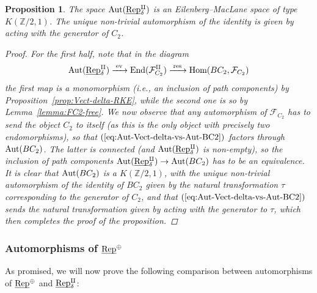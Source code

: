 \documentclass[reqno]{memo-l}
\theoremstyle{mythm}
\newtheorem{prop}[thm]{Proposition}
\theoremstyle{definition}
\numberwithin{equation}{section}
\newcommand{\Ff}{{\mathcal{F}}}
\newcommand{\Z} {{\mathbb{Z}}}
\DeclareMathOperator{\ev}{ev}
\renewcommand{\hom}{\textup{hom}}
\renewcommand{\hom}{{\textup{Hom}}}
\newcommand{\End}{{\textup{End}}}
\newcommand{\Aut}{\textup{Aut}}
\newcommand{\ulhelper}[2]{\underline{\setbox0=\hbox{$#1#2$}\dp0=0.4pt \box0\relax}}
\newcommand{\ul}[1]{{\mathpalette\ulhelper{#1}}\hbox{\rule[-2pt]{0pt}{0pt}}}
\newcommand{\Vect}{\textup{Rep}}
\begin{document}
\begin{prop}\label{prop:Aut-Vect-delta}
    The space $\Aut(\ul\Vect^\amalg_\delta)$ is an Eilenberg--MacLane space of type $K(\Z/2,1)$. The unique non-trivial automorphism of the identity is given by acting with the generator of $C_2$.
    \begin{proof}
        For the first half, note that in the diagram
        \begin{equation}\label{eq:Aut-Vect-delta-vs-Aut-BC2}
            \Aut(\ul\Vect^\amalg_\delta)\xrightarrow{\;\ev\;}\End(\Ff_{C_2}^\amalg)\xrightarrow{\;\text{res}\;}\hom(BC_2,\Ff_{C_2})
        \end{equation}
        the first map is a monomorphism (i.e., an inclusion of path components) by Proposition~\ref{prop:Vect-delta-RKE}, while the second one is so by Lemma~\ref{lemma:FC2-free}. We now observe that any automorphism of $\Ff_{C_2}$ has to send the object $C_2$ to itself (as this is the only object with precisely two endomorphisms), so that $(\ref{eq:Aut-Vect-delta-vs-Aut-BC2})$ factors through $\Aut(BC_2)$. The latter is connected (and $\Aut(\ul\Vect^\amalg_\delta)$ is non-empty), so the inclusion of path components $\Aut(\ul\Vect^\amalg_\delta)\to\Aut(BC_2)$ has to be an equivalence. It is clear that $\Aut(BC_2)$ is a $K(\Z/2,1)$, with the unique non-trivial automorphism of the identity of $BC_2$ given by the natural transformation $\tau$ corresponding to the generator of $C_2$, and that $(\ref{eq:Aut-Vect-delta-vs-Aut-BC2})$ sends the natural transformation given by acting with the generator to $\tau$, which then completes the proof of the proposition. 
    \end{proof}
\end{prop}

\subsubsection{Automorphisms of $\ul\Vect^\oplus$}\label{subsubsec:comparison}
As promised, we will now prove the following comparison between automorphisms of $\ul\Vect^\oplus$ and $\ul\Vect^\amalg_\delta$:
\end{document}

